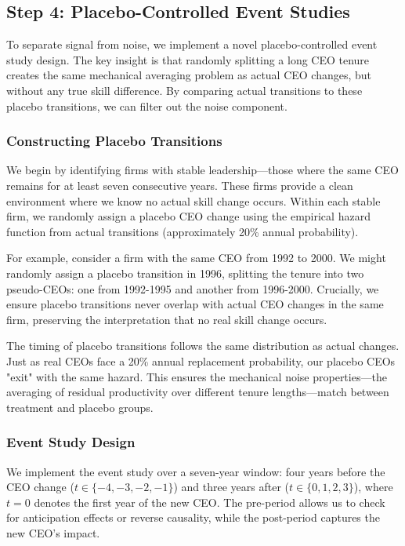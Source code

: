 \documentclass[11pt,a4paper]{article}
\begin{document}
\subsection{Step 4: Placebo-Controlled Event Studies}

To separate signal from noise, we implement a novel placebo-controlled event study design. The key insight is that randomly splitting a long CEO tenure creates the same mechanical averaging problem as actual CEO changes, but without any true skill difference. By comparing actual transitions to these placebo transitions, we can filter out the noise component.

\subsubsection{Constructing Placebo Transitions}

We begin by identifying firms with stable leadership—those where the same CEO remains for at least seven consecutive years. These firms provide a clean environment where we know no actual skill change occurs. Within each stable firm, we randomly assign a placebo CEO change using the empirical hazard function from actual transitions (approximately 20\% annual probability).

For example, consider a firm with the same CEO from 1992 to 2000. We might randomly assign a placebo transition in 1996, splitting the tenure into two pseudo-CEOs: one from 1992-1995 and another from 1996-2000. Crucially, we ensure placebo transitions never overlap with actual CEO changes in the same firm, preserving the interpretation that no real skill change occurs.

The timing of placebo transitions follows the same distribution as actual changes. Just as real CEOs face a 20\% annual replacement probability, our placebo CEOs "exit" with the same hazard. This ensures the mechanical noise properties—the averaging of residual productivity over different tenure lengths—match between treatment and placebo groups.

\subsubsection{Event Study Design}

We implement the event study over a seven-year window: four years before the CEO change ($t \in \{-4, -3, -2, -1\}$) and three years after ($t \in \{0, 1, 2, 3\}$), where $t=0$ denotes the first year of the new CEO. The pre-period allows us to check for anticipation effects or reverse causality, while the post-period captures the new CEO's impact.
\end{document}
